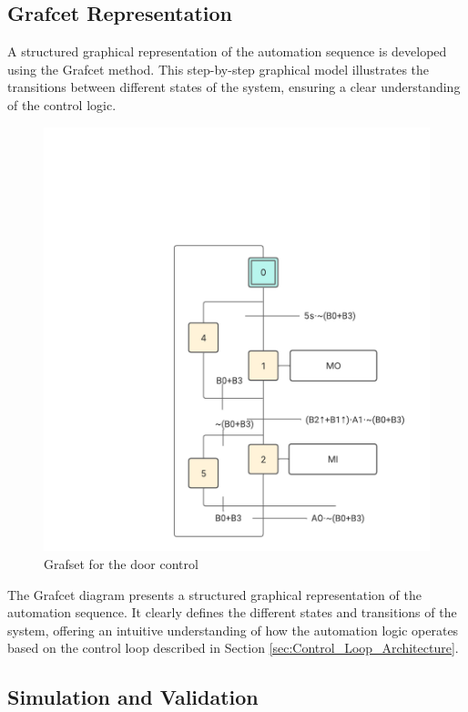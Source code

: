 \subsection{Grafcet Representation} \label{sec:Grafcet_Representation}

A structured graphical representation of the automation sequence is developed using the 
Grafcet method. This step-by-step graphical model illustrates the transitions between 
different states of the system, ensuring a clear understanding of the control logic.

\begin{figure}[H]
    \includegraphics[width=16cm]{Images/grafset.png}
    \centering
    \caption{Grafset for the door control}
    \label{fig:grafset}
\end{figure}

The Grafcet diagram presents a structured graphical representation of the automation sequence. It clearly defines 
the different states and transitions of the system, offering an intuitive 
understanding of how the automation logic operates based on the control loop described in Section \ref{sec:Control_Loop_Architecture}.

\subsection{Simulation and Validation} \label{sec:Simulation_and_Validation}

